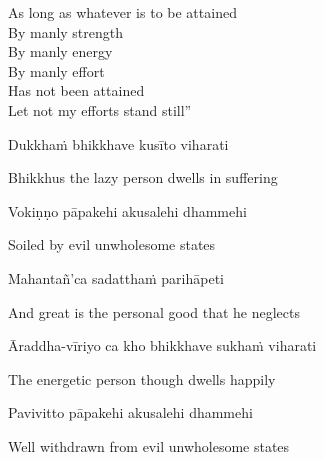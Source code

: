 \begin{english-verses}
  As long as whatever is to be attained\\
  By manly strength\\
  By manly energy\\
  By manly effort\ifdigital\makeatletter\hyperlink{endnote87-appendix}\makeatother\fi\\
  Has not been attained\\
  Let not my efforts stand still''
\end{english-verses}

Dukkhaṁ bhikkhave kusīto viharati

\begin{english}
  Bhikkhus the lazy person dwells in suffering
\end{english}

Vokiṇṇo pāpakehi akusalehi dhammehi

\begin{english}
  Soiled by evil unwholesome states
\end{english}

Mahantañ'ca sadatthaṁ parihāpeti

\begin{english}
  And great is the personal good that he neglects
\end{english}

Āraddha-vīriyo ca kho bhikkhave sukhaṁ viharati

\begin{english}
  The energetic person though dwells happily
\end{english}

Pavivitto pāpakehi akusalehi dhammehi

\begin{english}
  Well withdrawn from evil \ifdigital\makeatletter\hyperlink{endnote88-appendix}\makeatother\fi
  unwholesome states
\end{english}

